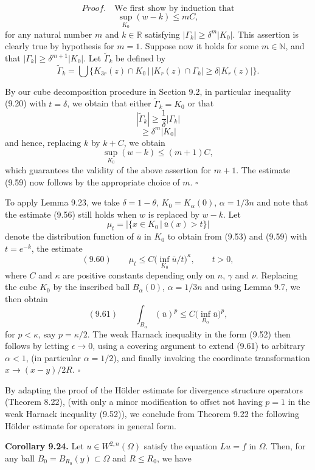
\[
\textit{Proof.}\quad \text{We first show by induction that}
\]
\[
\sup_{K_0}(w-k)\le mC,
\]
for any natural number $m$ and $k\in\mathbb{R}$ satisfying $|\Gamma_k|\ge \delta^m|K_0|$. This assertion is clearly true by hypothesis for $m=1$. Suppose now it holds for some $m\in\mathbb{N}$, and that $|\Gamma_k|\ge \delta^{m+1}|K_0|$. Let $\widetilde{\Gamma}_k$ be defined by
\[
\widetilde{\Gamma}_k=\bigcup\{K_{3r}(z)\cap K_0\,|\,|K_r(z)\cap\Gamma_k|\ge \delta|K_r(z)|\}.
\]

By our cube decomposition procedure in Section 9.2, in particular inequality (9.20) with $t=\delta$, we obtain that either $\widetilde{\Gamma}_k=K_0$ or that
\[
|\widetilde{\Gamma}_k|\ge \frac{1}{\delta}|\Gamma_k|
\]
\[
\ge \delta^m|K_0|
\]
and hence, replacing $k$ by $k+C$, we obtain
\[
\sup_{K_0}(w-k)\le (m+1)C,
\]
which guarantees the validity of the above assertion for $m+1$. The estimate (9.59) now follows by the appropriate choice of $m$. $\square$

To apply Lemma 9.23, we take $\delta=1-\theta$, $K_0=K_\alpha(0)$, $\alpha=1/3n$ and note that the estimate (9.56) still holds when $w$ is replaced by $w-k$. Let
\[
\mu_t=\bigl|\{x\in K_0\,|\,\bar{u}(x)>t\}\bigr|
\]
denote the distribution function of $\bar{u}$ in $K_0$ to obtain from (9.53) and (9.59) with $t=e^{-k}$, the estimate
\[
(9.60)\qquad \mu_t\le C\bigl(\inf_{K_0}\bar{u}/t\bigr)^{\kappa},\qquad t>0,
\]
where $C$ and $\kappa$ are positive constants depending only on $n$, $\gamma$ and $\nu$. Replacing the cube $K_0$ by the inscribed ball $B_\alpha(0)$, $\alpha=1/3n$ and using Lemma 9.7, we then obtain
\[
(9.61)\qquad \int_{B_\alpha}(\bar{u})^p\le C\bigl(\inf_{B_\alpha}\bar{u}\bigr)^p,
\]
for $p<\kappa$, say $p=\kappa/2$. The weak Harnack inequality in the form (9.52) then follows by letting $\epsilon\to 0$, using a covering argument to extend (9.61) to arbitrary $\alpha<1$, (in particular $\alpha=1/2$), and finally invoking the coordinate transformation $x\to (x-y)/2R$. $\square$


By adapting the proof of the Hölder estimate for divergence structure operators
(Theorem 8.22), (with only a minor modification to offset not having $p=1$ in the
weak Harnack inequality (9.52)), we conclude from Theorem 9.22 the following
Hölder estimate for operators in general form.

\noindent\textbf{Corollary 9.24.} \quad Let $u \in W^{2,n}(\Omega)$ satisfy the equation $Lu = f$ in $\Omega$. Then, for any ball
$B_0 = B_{R_0}(y) \subset \Omega$ and $R \leq R_0$, we have

